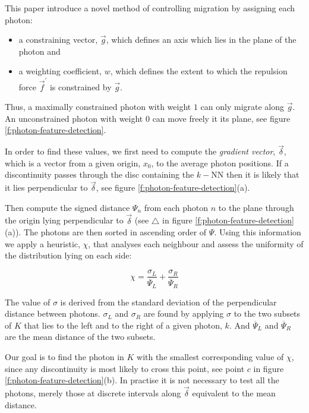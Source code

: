 This paper introduce a novel method of controlling migration by assigning each photon:

\begin{itemize}
	\item a constraining vector, $\vec{g}$, which defines an axis which lies in the plane of the photon and 
	\item a weighting coefficient, $w$, which defines the extent to which the repulsion force $\vec{f}^{'}$ is constrained by $\vec{g}$.
\end{itemize}

Thus, a maximally constrained photon with weight $1$ can only migrate along $\vec{g}$. An unconstrained photon with weight $0$ can move freely it its plane, see figure \ref{f:photon-feature-detection}.

In order to find these values, we first need to compute the \textit{gradient vector}, $\vec{\delta}$, which is a vector from a given origin, $x_0$, to the average photon positions. If a discontinuity passes through the disc containing the $k-$NN then it is likely that it lies perpendicular to $\vec{\delta}$, see figure \ref{f:photon-feature-detection}(a).

Then compute the signed distance $\Psi_n$ from each photon $n$ to the plane through the origin lying perpendicular to $\vec{\delta}$ (see $\triangle$ in figure \ref{f:photon-feature-detection}(a)). The photons are then sorted in ascending order of $\Psi$. Using this information we apply a heuristic, $\chi$, that analyses each neighbour and assess the uniformity of the distribution lying on each side:

\begin{equation}
	\chi=\frac{\sigma_L}{\overline{\Psi}_L}+\frac{\sigma_R}{\overline{\Psi}_R}
\end{equation}

The value of $\sigma$ is derived from the standard deviation of the perpendicular distance between photons. $\sigma_L$ and $\sigma_R$ are found by applying $\sigma$ to the two subsets of $K$ that lies to the left and to the right of a given photon, $k$. And $\overline{\Psi}_L$ and $\overline{\Psi}_R$ are the mean distance of the two subsets.

Our goal is to find the photon in $K$ with the smallest corresponding value of $\chi$, since any discontinuity is most likely to cross this point, see point $c$ in figure \ref{f:photon-feature-detection}(b). In practise it is not necessary to test all the photons, merely those at discrete intervals along $\vec{\delta}$ equivalent to the mean distance.

